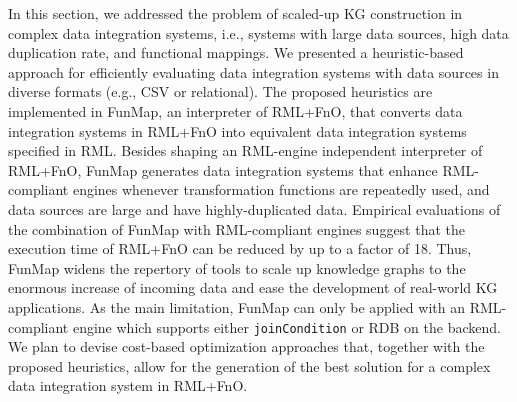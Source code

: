 In this section, we addressed the problem of scaled-up KG construction in complex data integration systems, i.e., systems with large data sources, high data duplication rate, and functional mappings. We presented a heuristic-based approach for efficiently evaluating data integration systems with data sources in diverse formats (e.g., CSV or relational). The proposed heuristics are implemented in FunMap, an interpreter of RML+FnO, that converts data integration systems in RML+FnO into equivalent data integration systems specified in RML. Besides shaping an RML-engine independent interpreter of RML+FnO, FunMap generates data integration systems that enhance RML-compliant engines whenever transformation functions are repeatedly used, and data sources are large and have highly-duplicated data. Empirical evaluations of the combination of FunMap with RML-compliant engines suggest that the execution time of RML+FnO can be reduced by up to a factor of 18. Thus, FunMap widens the repertory of tools to scale up knowledge graphs to the enormous increase of incoming data and ease the development of real-world KG applications. As the main limitation, FunMap can only be applied with an RML-compliant engine which supports either \verb|joinCondition| or RDB on the backend. We plan to devise cost-based optimization approaches that, together with the proposed heuristics, allow for the generation of the best solution for a complex data integration system in RML+FnO. 